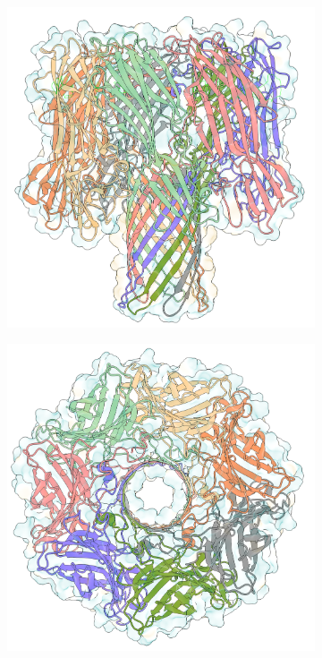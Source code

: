 \begin{figure}[ht!]
  \begin{centering}
  \begin{subfigure}[t]{\dimexpr.4\linewidth-1.3em\relax}
  \centering
  \includegraphics[width=\linewidth,valign=t]{Figures/ahl-front-c.png}
  \end{subfigure}%
  \begin{subfigure}[t]{\dimexpr.4\linewidth-1.3em\relax}
  \centering
  \includegraphics[width=\linewidth,valign=t]{Figures/ahl-top-c.png}
  \end{subfigure}


\end{centering}
\end{figure}
